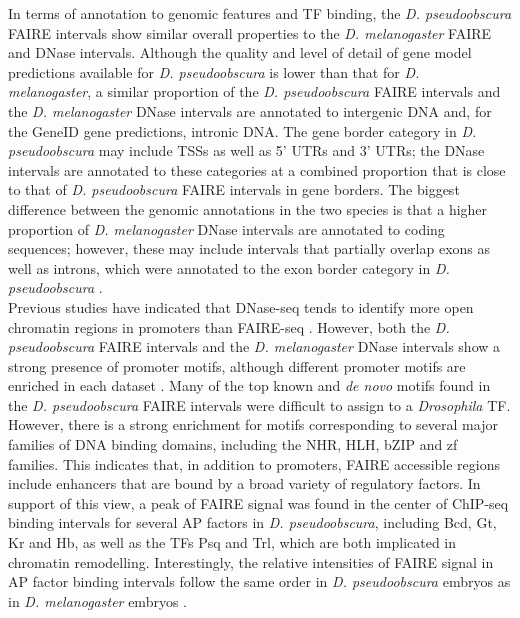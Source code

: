In terms of annotation to genomic features and TF binding, the \emph{D. pseudoobscura} FAIRE intervals show similar overall properties to the \emph{D. melanogaster} FAIRE and DNase intervals. Although the quality and level of detail of gene model predictions available for \emph{D. pseudoobscura} is lower than that for \emph{D. \\
melanogaster}, a similar proportion of the \emph{D. pseudoobscura} FAIRE intervals and the \emph{D. melanogaster} DNase intervals are annotated to intergenic DNA and, for the GeneID gene predictions, intronic DNA. The gene border category in \emph{D. pseudoobscura} may include TSSs as well as 5’ UTRs and 3’ UTRs; the DNase intervals are annotated to these categories at a combined proportion that is close to that of \emph{D. pseudoobscura} FAIRE intervals in gene borders. The biggest difference between the genomic annotations in the two species is that a higher proportion of \emph{D. melanogaster} DNase intervals are annotated to coding sequences; however, these may include intervals that partially overlap exons as well as introns, which were annotated to the exon border category in \emph{D. pseudoobscura} \citep{thomas_dynamic_2011}.\\

Previous studies have indicated that DNase-seq tends to identify more open chromatin regions in promoters than FAIRE-seq \citep{koohy_chromatin_2013}. However, both the \emph{D. pseudoobscura} FAIRE intervals and the \emph{D. melanogaster} DNase intervals show a strong presence of promoter motifs, although different promoter motifs are enriched in each dataset \citep{thomas_dynamic_2011}. Many of the top known and \emph{de novo} motifs found in the \emph{D. pseudoobscura} FAIRE intervals were difficult to assign to a \emph{Drosophila} TF. However, there is a strong enrichment for motifs corresponding to several major families of DNA binding domains, including the NHR, HLH, bZIP and zf families. This indicates that, in addition to promoters, FAIRE accessible regions include enhancers that are bound by a broad variety of regulatory factors. In support of this view, a peak of FAIRE signal was found in the center of ChIP-seq binding intervals for several AP factors in \emph{D. pseudoobscura}, including Bcd, Gt, Kr and Hb, as well as the TFs Psq and Trl, which are both implicated in chromatin remodelling. Interestingly, the relative intensities of FAIRE signal in AP factor binding intervals follow the same order in \emph{D. pseudoobscura} embryos as in \emph{D. melanogaster} embryos \citep{mckay_common_2013}.\\

